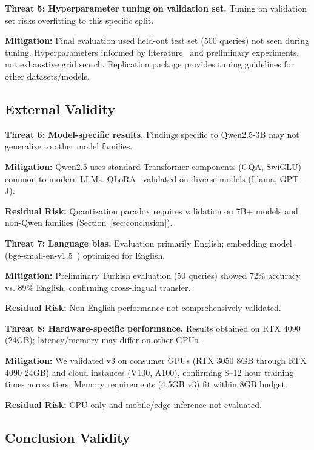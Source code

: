\documentclass[pdflatex,sn-basic]{sn-jnl}
\begin{document}
\noindent
\textbf{Threat 5: Hyperparameter tuning on validation set.} 
Tuning on validation set risks overfitting to this specific split.

\noindent
\textbf{Mitigation:} 
Final evaluation used held-out test set (500 queries) not seen during tuning. Hyperparameters informed by literature~\citep{dettmers2023qlora} and preliminary experiments, not exhaustive grid search. Replication package provides tuning guidelines for other datasets/models.

\subsection{External Validity}
\label{sec:threats-external}

\noindent
\textbf{Threat 6: Model-specific results.} 
Findings specific to Qwen2.5-3B may not generalize to other model families.

\noindent
\textbf{Mitigation:} 
Qwen2.5 uses standard Transformer components (GQA, SwiGLU) common to modern LLMs. QLoRA~\citep{dettmers2023qlora} validated on diverse models (Llama, GPT-J).

\noindent
\textbf{Residual Risk:} 
Quantization paradox requires validation on 7B+ models and non-Qwen families (Section~\ref{sec:conclusion}).

\noindent
\textbf{Threat 7: Language bias.} 
Evaluation primarily English; embedding model (bge-small-en-v1.5~\citep{bge2023}) optimized for English.

\noindent
\textbf{Mitigation:} 
Preliminary Turkish evaluation (50 queries) showed 72\% accuracy vs. 89\% English, confirming cross-lingual transfer.

\noindent
\textbf{Residual Risk:} 
Non-English performance not comprehensively validated.

\noindent
\textbf{Threat 8: Hardware-specific performance.} 
Results obtained on RTX 4090 (24GB); latency/memory may differ on other GPUs.

\noindent
\textbf{Mitigation:} 
We validated v3 on consumer GPUs (RTX 3050 8GB through RTX 4090 24GB) and cloud instances (V100, A100), confirming 8--12 hour training times across tiers. Memory requirements (4.5GB v3) fit within 8GB budget.

\noindent
\textbf{Residual Risk:} 
CPU-only and mobile/edge inference not evaluated.

\subsection{Conclusion Validity}
\label{sec:threats-conclusion}
\end{document}
